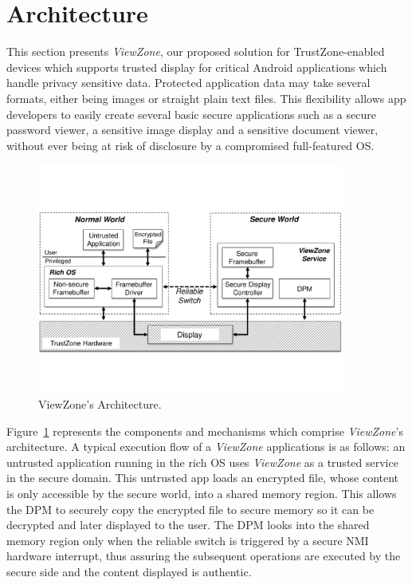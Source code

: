 
% 
% 
\section{Architecture}
\label{sec:architecture}

This section presents \emph{ViewZone}, our proposed solution for TrustZone-enabled devices which supports trusted display for critical Android applications which handle privacy sensitive data. Protected application data may take several formats, either being images or straight plain text files. This flexibility allows app developers to easily create several basic secure applications such as a secure password viewer, a sensitive image display and a sensitive document viewer, without ever being at risk of disclosure by a compromised full-featured OS.

\begin{figure}[t!]
	\centering
	\includegraphics[width=0.9\textwidth]{img/viewzone_architecture.pdf}
	\caption{ViewZone's Architecture.}
	\label{fig:viewzone_architecture}
\end{figure}

Figure~\ref{fig:viewzone_architecture} represents the components and mechanisms which comprise \emph{ViewZone}'s architecture. A typical execution flow of a \emph{ViewZone} applications is as follows: an untrusted application running in the rich OS uses \emph{ViewZone} as a trusted service in the secure domain. This untrusted app loads an encrypted file, whose content is only accessible by the secure world, into a shared memory region. This allows the \ac{DPM} to securely copy the encrypted file to secure memory so it can be decrypted and later displayed to the user. The \ac{DPM} looks into the shared memory region only when the reliable switch is triggered by a secure \ac{NMI} hardware interrupt, thus assuring the subsequent operations are executed by the secure side and the content displayed is authentic.

